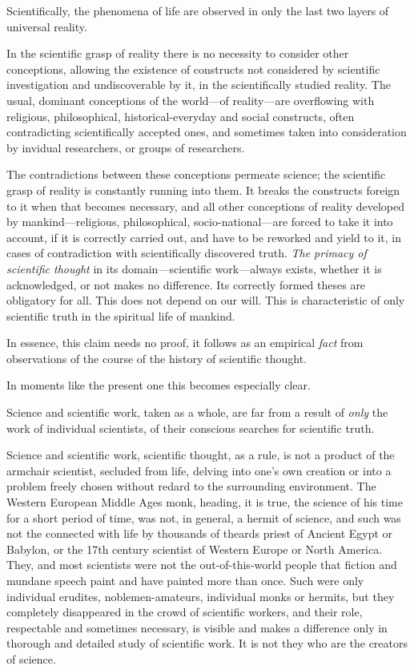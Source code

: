 Scientifically, the phenomena of life are observed in only the last two layers
of universal reality.

In the scientific grasp of reality there is no necessity to consider other
conceptions, allowing the existence of constructs not considered by scientific
investigation and undiscoverable by it, in the scientifically studied reality.
The usual, dominant conceptions of the world---of reality---are overflowing
with religious, philosophical, historical-everyday and social constructs, often
contradicting scientifically accepted ones, and sometimes taken into
consideration by invidual researchers, or groups of researchers.

The contradictions between these conceptions permeate science; the scientific
grasp of reality is constantly running into them.  It breaks the constructs
foreign to it when that becomes necessary, and all other conceptions of reality
developed by mankind---religious, philosophical, socio-national---are forced to
take it into account, if it is correctly carried out, and have to be reworked
and yield to it, in cases of contradiction with scientifically discovered
truth.  \emph{The primacy of scientific thought} in its domain---scientific
work---always exists, whether it is acknowledged, or not makes no difference.
Its correctly formed theses are obligatory for all.  This does not depend on
our will.  This is characteristic of only scientific truth in the spiritual
life of mankind.

In essence, this claim needs no proof, it follows as an empirical \emph{fact}
from observations of the course of the history of scientific thought.

In moments like the present one this becomes especially clear.


\Section %
Science and scientific work, taken as a whole, are far from a result of
\emph{only} the work of individual scientists, of their conscious searches for
scientific truth.

Science and scientific work, scientific thought, as a rule, is not a product of
the armchair scientist, secluded from life, delving into one's own creation or
into a problem freely chosen without redard to the surrounding environment.
The Western European Middle Ages monk, heading, it is true, the science of his
time for a short period of time, was not, in general, a hermit of science, and
such was not the connected with life by thousands of theards priest of Ancient
Egypt or Babylon, or the 17th century scientist of Western Europe or North
America.  They, and most scientists were not the out-of-this-world people that
fiction and mundane speech paint and have painted more than once.  Such were
only individual erudites, noblemen-amateurs, individual monks or hermits, but
they completely disappeared in the crowd of scientific workers, and their role,
respectable and sometimes necessary, is visible and makes a difference only in
thorough and detailed study of scientific work.  It is not they who are the
creators of science.

